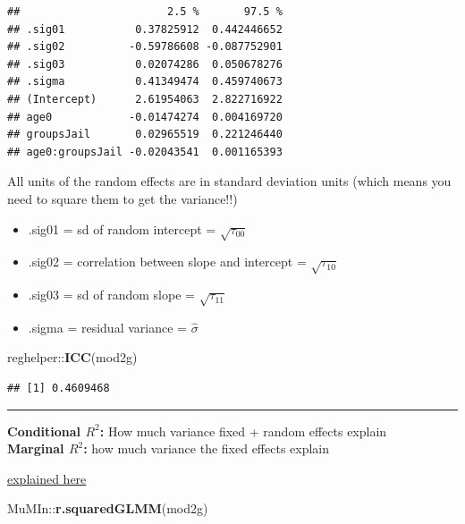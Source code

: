 \documentclass[]{article}
\newenvironment{Shaded}{\begin{snugshade}}{\end{snugshade}}
\newcommand{\KeywordTok}[1]{\textcolor[rgb]{0.13,0.29,0.53}{\textbf{{#1}}}}
\newcommand{\NormalTok}[1]{{#1}}
\begin{document}
\begin{verbatim}
##                       2.5 %       97.5 %
## .sig01           0.37825912  0.442446652
## .sig02          -0.59786608 -0.087752901
## .sig03           0.02074286  0.050678276
## .sigma           0.41349474  0.459740673
## (Intercept)      2.61954063  2.822716922
## age0            -0.01474274  0.004169720
## groupsJail       0.02965519  0.221246440
## age0:groupsJail -0.02043541  0.001165393
\end{verbatim}

All units of the random effects are in standard deviation units (which
means you need to square them to get the variance!!)\\

\begin{itemize}
  \item .sig01 = sd of random intercept = $\sqrt{\tau_{00}}$  
  \item .sig02 = correlation between slope and intercept = $\sqrt{\tau_{10}}$  
  \item .sig03 = sd of random slope = $\sqrt{\tau_{11}}$  
  \item .sigma = residual variance = $\hat{\sigma}$  
\end{itemize}

\small

\begin{Shaded}
\begin{Highlighting}[]
\NormalTok{reghelper::}\KeywordTok{ICC}\NormalTok{(mod2g)}
\end{Highlighting}
\end{Shaded}

\begin{verbatim}
## [1] 0.4609468
\end{verbatim}

\begin{center}\rule{0.5\linewidth}{\linethickness}\end{center}

\small
\textbf{Conditional $R^2$:} How much variance fixed + random effects
explain\\
\textbf{Marginal $R^2$:} how much variance the fixed effects explain

\href{https://jonlefcheck.net/2013/03/13/r2-for-linear-mixed-effects-models/}{explained
here}

\begin{Shaded}
\begin{Highlighting}[]
\NormalTok{MuMIn::}\KeywordTok{r.squaredGLMM}\NormalTok{(mod2g)}
\end{Highlighting}
\end{Shaded}
\end{document}
